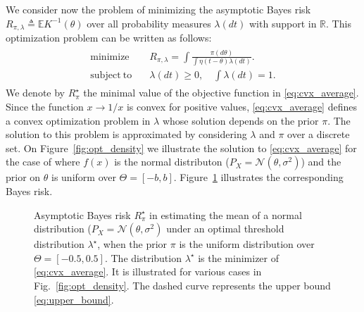 \documentclass[letterpaper, 11pt]{IEEEtran}      %
\newcommand{\Ncal}{\mathcal{N}}
\begin{document}
 We consider now the problem of minimizing the asymptotic Bayes risk $
R_{\pi,\lambda} \triangleq \mathbb E  K^{-1}(\theta)$ over all probability measures $\lambda(dt)$ with support in $\mathbb R$. This optimization problem can be written as follows:
\begin{align}
\label{eq:cvx_average}
\begin{split}
\mathrm{minimize} \quad & R_{\pi,\lambda} =  \int \frac{\pi(d\theta)}{ \int \eta \left( t-\theta\right) \lambda(dt)}. \\ 
\mathrm{subject~to} \quad & \lambda(dt)\geq 0,\quad \int \lambda(dt) =1. 
\end{split}
\end{align}
We denote by $R^\star_{\pi}$ the minimal value of the objective function in \eqref{eq:cvx_average}. Since the function $x \rightarrow 1/x$ is convex for positive values, \eqref{eq:cvx_average} defines a convex optimization problem in $\lambda$ whose solution depends on the prior $\pi$. The solution to this problem is approximated by considering $\lambda$ and $\pi$ over a discrete set. On Figure~\ref{fig:opt_density} we illustrate the solution to \eqref{eq:cvx_average} for the case of where $f(x)$ is the normal distributon ($P_X = \Ncal(\theta, \sigma^2)$) and the prior on $\theta$ is uniform over $\Theta = [-b,b]$. Figure~\ref{fig:dist_bound_uniform} illustrates the corresponding Bayes risk. 
\par
\begin{figure}
\begin{center}

\caption{Asymptotic Bayes risk $R_{\pi}^\star$ in estimating the mean of a normal distribution ($P_X = \Ncal(\theta, \sigma^2)$ under an optimal threshold distribution $\lambda^\star$, when the prior $\pi$ is the uniform distribution over $\Theta = [-0.5,0.5]$. 
%
The distribution $\lambda^\star$ is the minimizer of \eqref{eq:cvx_average}. It is illustrated for various cases in Fig.~\ref{fig:opt_density}. The dashed curve represents the upper bound \eqref{eq:upper_bound}. 
\label{fig:dist_bound_uniform}  }
\end{center}
\end{figure}
\end{document}
